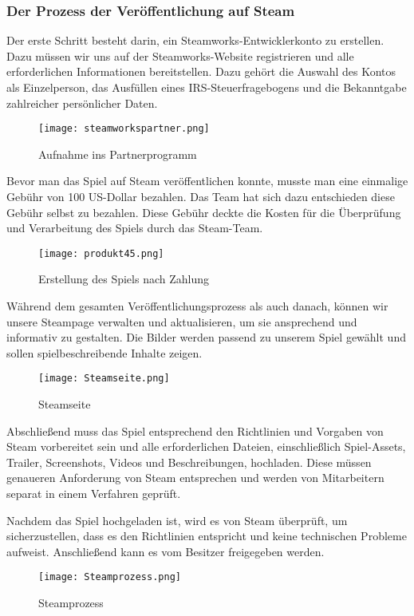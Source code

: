 \subsubsection{Der Prozess der Veröffentlichung auf Steam}\label{subsubsec:Veröffentlichungsprozess}

 Der erste Schritt besteht darin, ein Steamworks-Entwicklerkonto zu erstellen.
Dazu müssen wir uns auf der Steamworks-Website registrieren und alle erforderlichen Informationen bereitstellen.
Dazu gehört die Auswahl des Kontos als Einzelperson, das Ausfüllen eines IRS-Steuerfragebogens und die Bekanntgabe zahlreicher persönlicher Daten.
\begin{figure}[H]
    \texttt{[image: steamworkspartner.png]}
    \caption{Aufnahme ins Partnerprogramm}
\end{figure}

 Bevor man das Spiel auf Steam veröffentlichen konnte, musste man eine einmalige Gebühr von 100 US-Dollar bezahlen.
Das Team hat sich dazu entschieden diese Gebühr selbst zu bezahlen.
Diese Gebühr deckte die Kosten für die Überprüfung und Verarbeitung des Spiels durch das Steam-Team.
\begin{figure}[H]
    \texttt{[image: produkt45.png]}
    \caption{Erstellung des Spiels nach Zahlung}
\end{figure}

 Während dem gesamten Veröffentlichungsprozess als auch danach, können wir unsere Steampage verwalten und aktualisieren, um sie ansprechend und informativ zu gestalten.
Die Bilder werden passend zu unserem Spiel gewählt und sollen spielbeschreibende Inhalte zeigen.
\begin{figure}[H]
    \texttt{[image: Steamseite.png]}
    \caption{Steamseite}
\end{figure}

 Abschließend muss das Spiel entsprechend den Richtlinien und Vorgaben von Steam vorbereitet sein und alle erforderlichen Dateien, einschließlich Spiel-Assets, Trailer, Screenshots, Videos und Beschreibungen, hochladen.
Diese müssen genaueren Anforderung von Steam entsprechen und werden von Mitarbeitern separat in einem Verfahren geprüft.

 Nachdem das Spiel hochgeladen ist, wird es von Steam überprüft, um sicherzustellen, dass es den Richtlinien entspricht und keine technischen Probleme aufweist.
Anschließend kann es vom Besitzer freigegeben werden.
\begin{figure}[H]
    \texttt{[image: Steamprozess.png]}
    \caption{Steamprozess}
\end{figure}

